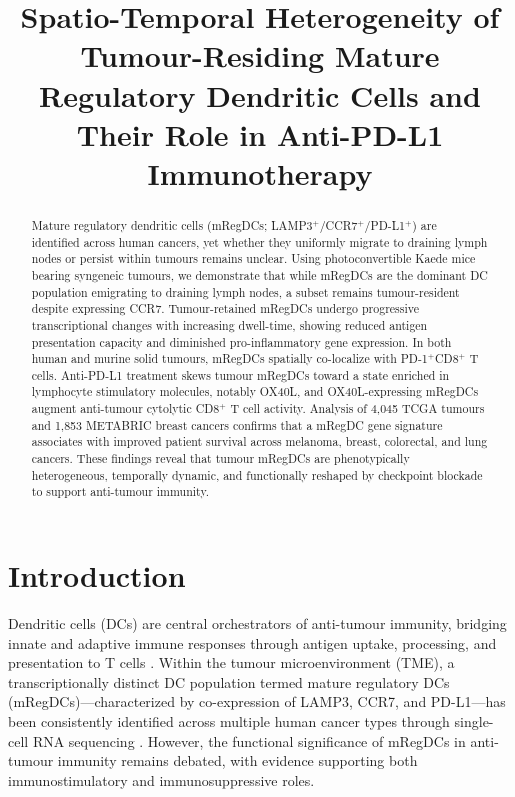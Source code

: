 \documentclass[11pt]{article}
\title{Spatio-Temporal Heterogeneity of Tumour-Residing Mature Regulatory Dendritic Cells and Their Role in Anti-PD-L1 Immunotherapy}
\author{}
\date{}
\begin{document}
\maketitle

\begin{abstract}
Mature regulatory dendritic cells (mRegDCs; LAMP3$^{+}$/CCR7$^{+}$/PD-L1$^{+}$) are identified across human cancers, yet whether they uniformly migrate to draining lymph nodes or persist within tumours remains unclear. Using photoconvertible Kaede mice bearing syngeneic tumours, we demonstrate that while mRegDCs are the dominant DC population emigrating to draining lymph nodes, a subset remains tumour-resident despite expressing CCR7. Tumour-retained mRegDCs undergo progressive transcriptional changes with increasing dwell-time, showing reduced antigen presentation capacity and diminished pro-inflammatory gene expression. In both human and murine solid tumours, mRegDCs spatially co-localize with PD-1$^{+}$CD8$^{+}$ T cells. Anti-PD-L1 treatment skews tumour mRegDCs toward a state enriched in lymphocyte stimulatory molecules, notably OX40L, and OX40L-expressing mRegDCs augment anti-tumour cytolytic CD8$^{+}$ T cell activity. Analysis of 4,045 TCGA tumours and 1,853 METABRIC breast cancers confirms that a mRegDC gene signature associates with improved patient survival across melanoma, breast, colorectal, and lung cancers. These findings reveal that tumour mRegDCs are phenotypically heterogeneous, temporally dynamic, and functionally reshaped by checkpoint blockade to support anti-tumour immunity.
\end{abstract}

\section{Introduction}

Dendritic cells (DCs) are central orchestrators of anti-tumour immunity, bridging innate and adaptive immune responses through antigen uptake, processing, and presentation to T cells \citep{wculek2020dendritic,gardner2020dendritic}. Within the tumour microenvironment (TME), a transcriptionally distinct DC population termed mature regulatory DCs (mRegDCs)---characterized by co-expression of LAMP3, CCR7, and PD-L1---has been consistently identified across multiple human cancer types through single-cell RNA sequencing \citep{maier2020systematic,cheng2021multi}. However, the functional significance of mRegDCs in anti-tumour immunity remains debated, with evidence supporting both immunostimulatory and immunosuppressive roles.
\end{document}
